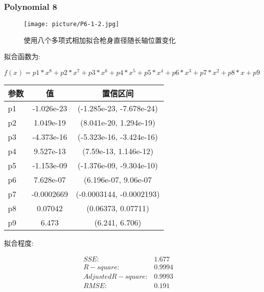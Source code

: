 \documentclass[UTF8]{ctexart}
\begin{document}
			\subsubsection{Polynomial 8}
				\begin{figure}[h]
						\texttt{[image: picture/P6-1-2.jpg]}
						\caption{使用八个多项式相加拟合枪身直径随长轴位置变化}
				\end{figure}
				\begin{flushleft}
					拟合函数为:
				\end{flushleft}
				\begin{center}
					\[  f(x) = p1*x^8 + p2*x^7 + p3*x^6 + p4*x^5 + p5*x^4 + p6*x^3 + p7*x^2 + p8*x + p9\]				
				\begin{tabular}{|l|c|c|}
					\hline
					参数&值&置信区间\\
					\hline
					p1 & -1.026e-23 &  (-1.285e-23, -7.678e-24)\\
					\hline
					p2 & 1.049e-19&  (8.041e-20, 1.294e-19)\\
					\hline
					p3 & -4.373e-16&  (-5.323e-16, -3.424e-16)\\
					\hline
					p4 &  9.527e-13&  (7.59e-13, 1.146e-12)\\
					\hline
					p5 & -1.153e-09&  (-1.376e-09, -9.304e-10)\\
					\hline
					p6 & 7.628e-07&  (6.196e-07, 9.06e-07\\
					\hline
					p7 & -0.0002669&  (-0.0003144, -0.0002193)\\
					\hline
					p8 & 0.07042&  (0.06373, 0.07711)\\
					\hline
					p9 & 6.473&  (6.241, 6.706)\\
					\hline
				\end{tabular}
			\end{center}
			\begin{flushleft}
				拟合程度:
			\end{flushleft}
				\begin{center}
				$$
				\begin{matrix}
				SSE:&1.677\\
				R-square:&0.9994\\
				Adjusted R-square:&0.9993\\
				RMSE:&0.191\\
				\end{matrix}
				$$
			\end{center}
\end{document}
